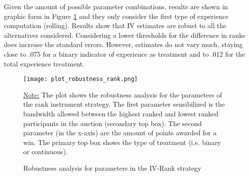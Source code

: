 Given the amount of possible parameter combinations, results are shown in graphic form in Figure \ref{fig:plot_robustness_rank} and they only consider the first type of experience computation (rolling). Results show that IV estimates are robust to all the alternatives considered. Considering a lower thresholds for the difference in ranks does increase the standard errors. However, estimates do not vary much, staying close to .075 for a binary indicator of experience as treatment and to .012 for the total experience treatment.

\begin{figure}[h]
  \texttt{[image: plot\_robustness\_rank.png]}
  \caption{Robustness analysis for parameters in the IV-Rank strategy}
  \label{fig:plot_robustness_rank}
  \vskip 0.5mm
  {\noindent \justifying\footnotesize\underline {Note:} The plot shows the robustness analysis for the parameters of the rank instrument strategy. The first parameter sensibilized is the bandwidth allowed between the highest ranked and lowest ranked participants in the auction (secondary top box). The second parameter (in the x-axis) are the amount of points awarded for a win. The primary top box shows the type of treatment (i.e. binary or continuous). \par}
\end{figure}
